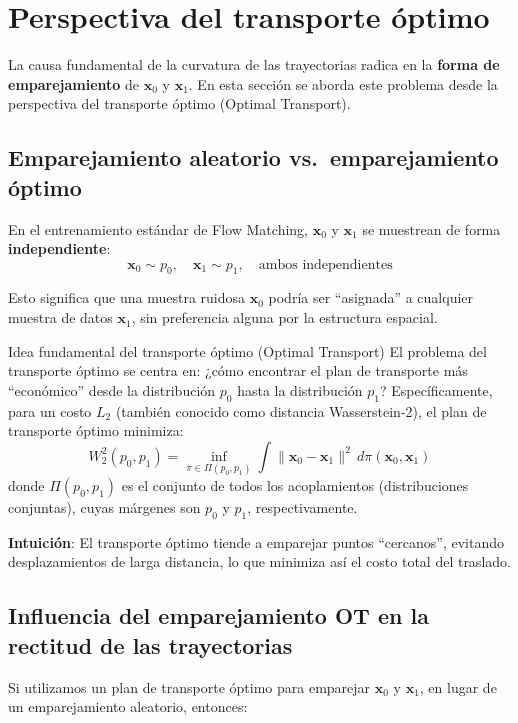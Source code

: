 \section{Perspectiva del transporte óptimo}

La causa fundamental de la curvatura de las trayectorias radica en la \textbf{forma de emparejamiento} de $\mathbf{x}_0$ y $\mathbf{x}_1$. En esta sección se aborda este problema desde la perspectiva del transporte óptimo (Optimal Transport).

\subsection{Emparejamiento aleatorio vs.\ emparejamiento óptimo}

En el entrenamiento estándar de Flow Matching, $\mathbf{x}_0$ y $\mathbf{x}_1$ se muestrean de forma \textbf{independiente}:
$$\mathbf{x}_0 \sim p_0, \quad \mathbf{x}_1 \sim p_1, \quad \text{ambos independientes}$$

Esto significa que una muestra ruidosa $\mathbf{x}_0$ podría ser ``asignada'' a cualquier muestra de datos $\mathbf{x}_1$, sin preferencia alguna por la estructura espacial.

\begin{importantbox}{Idea fundamental del transporte óptimo (Optimal Transport)}
El problema del transporte óptimo se centra en: ¿cómo encontrar el plan de transporte más ``económico'' desde la distribución $p_0$ hasta la distribución $p_1$? Específicamente, para un costo $L_2$ (también conocido como distancia Wasserstein-2), el plan de transporte óptimo minimiza:
$$W_2^2(p_0, p_1) = \inf_{\pi \in \Pi(p_0, p_1)} \int \|\mathbf{x}_0 - \mathbf{x}_1\|^2 \, d\pi(\mathbf{x}_0, \mathbf{x}_1)$$
donde $\Pi(p_0, p_1)$ es el conjunto de todos los acoplamientos (distribuciones conjuntas), cuyas márgenes son $p_0$ y $p_1$, respectivamente.

\medskip
\textbf{Intuición}: El transporte óptimo tiende a emparejar puntos ``cercanos'', evitando desplazamientos de larga distancia, lo que minimiza así el costo total del traslado.
\end{importantbox}

\subsection{Influencia del emparejamiento OT en la rectitud de las trayectorias}

Si utilizamos un plan de transporte óptimo para emparejar $\mathbf{x}_0$ y $\mathbf{x}_1$, en lugar de un emparejamiento aleatorio, entonces:

